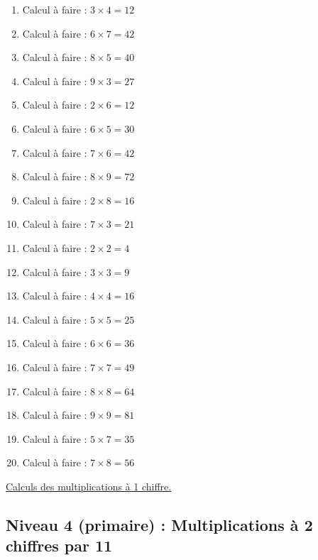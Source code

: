 \documentclass[11pt]{article}
\begin{document}
\begin{enumerate}
\item Calcul à faire :  \(3\times 4 = 12\)
\item Calcul à faire :  \(6\times 7 = 42\)
\item Calcul à faire :  \(8\times 5 = 40\)
\item Calcul à faire :  \(9\times 3 = 27\)
\item Calcul à faire :  \(2\times 6 = 12\)
\item Calcul à faire :  \(6\times 5 = 30\)
\item Calcul à faire :  \(7\times 6 = 42\)
\item Calcul à faire :  \(8\times 9 = 72\)
\item Calcul à faire :  \(2\times 8 = 16\)
\item Calcul à faire :  \(7\times 3 = 21\)
\item Calcul à faire :  \(2\times 2 = 4\)
\item Calcul à faire :  \(3\times 3 = 9\)
\item Calcul à faire :  \(4\times 4 = 16\)
\item Calcul à faire :  \(5\times 5 = 25\)
\item Calcul à faire :  \(6\times 6 = 36\)
\item Calcul à faire :  \(7\times 7 = 49\)
\item Calcul à faire :  \(8\times 8 = 64\)
\item Calcul à faire :  \(9\times 9 = 81\)
\item Calcul à faire :  \(5\times 7 = 35\)
\item Calcul à faire :  \(7\times 8 = 56\)
\end{enumerate}




\hyperref[orgbc31eca]{Calculs des multiplications à 1 chiffre.}



\newpage

\subsection{Niveau 4 (primaire) : Multiplications à 2 chiffres par 11}
\label{sec:orgd2011db}
\label{orge768c2f}
\end{document}
